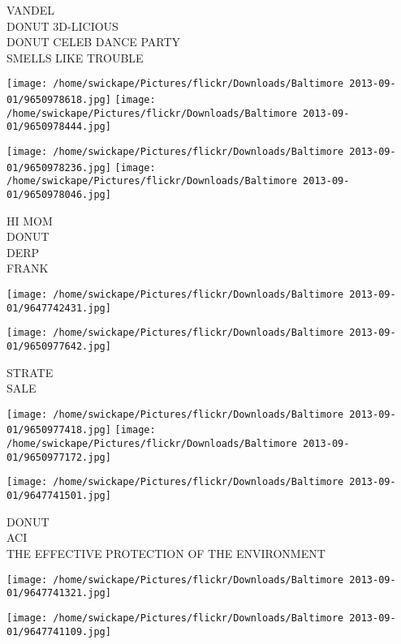 \documentclass[10pt,letterpaper]{article}
\begin{document}
VANDEL\\
DONUT 3D{-}LICIOUS\\
DONUT CELEB DANCE PARTY\\
SMELLS LIKE TROUBLE\\
\pagebreak

\texttt{[image: /home/swickape/Pictures/flickr/Downloads/Baltimore 2013-09-01/9650978618.jpg]}
\texttt{[image: /home/swickape/Pictures/flickr/Downloads/Baltimore 2013-09-01/9650978444.jpg]}

\texttt{[image: /home/swickape/Pictures/flickr/Downloads/Baltimore 2013-09-01/9650978236.jpg]}
\texttt{[image: /home/swickape/Pictures/flickr/Downloads/Baltimore 2013-09-01/9650978046.jpg]}

HI MOM\\
DONUT\\
DERP\\
FRANK\\
\pagebreak

\texttt{[image: /home/swickape/Pictures/flickr/Downloads/Baltimore 2013-09-01/9647742431.jpg]}

\vspace{0.25in}
\texttt{[image: /home/swickape/Pictures/flickr/Downloads/Baltimore 2013-09-01/9650977642.jpg]}

STRATE\\
SALE\\
\pagebreak

\texttt{[image: /home/swickape/Pictures/flickr/Downloads/Baltimore 2013-09-01/9650977418.jpg]}
\texttt{[image: /home/swickape/Pictures/flickr/Downloads/Baltimore 2013-09-01/9650977172.jpg]}

\vspace{0.25in}
\texttt{[image: /home/swickape/Pictures/flickr/Downloads/Baltimore 2013-09-01/9647741501.jpg]}

DONUT\\
ACI\\
THE EFFECTIVE PROTECTION OF THE ENVIRONMENT\\
\pagebreak

\texttt{[image: /home/swickape/Pictures/flickr/Downloads/Baltimore 2013-09-01/9647741321.jpg]}

\vspace{0.25in}
\texttt{[image: /home/swickape/Pictures/flickr/Downloads/Baltimore 2013-09-01/9647741109.jpg]}
\end{document}
